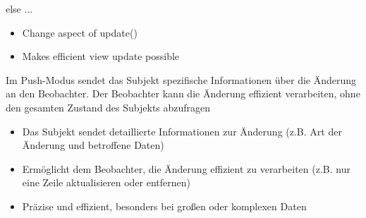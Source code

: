 \begin{enumerate}
\begin{codeBlock}{}
{{{                } else {
                    ...
                }
            }
        }
    \end{codeBlock}
    \begin{itemize}
        \item Change aspect  of update()
        \item Makes efficient view update possible
    \end{itemize}
    \begin{infoBox}
        Im Push-Modus sendet das Subjekt spezifische Informationen über die Änderung an den Beobachter. Der Beobachter kann die Änderung effizient verarbeiten, ohne den gesamten Zustand des Subjekts abzufragen\\
        \begin{itemize}
            \item Das Subjekt sendet detaillierte Informationen zur Änderung (z.B. Art der Änderung und betroffene Daten)
            \item Ermöglicht dem Beobachter, die Änderung effizient zu verarbeiten (z.B. nur eine Zeile aktualisieren oder entfernen)
            \item {} Präzise und effizient, besonders bei großen oder komplexen Daten
        \end{itemize}
    \end{infoBox}
\end{enumerate}
